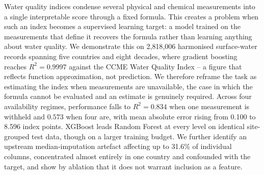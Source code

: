 Water quality indices condense several physical and chemical measurements into a single
interpretable score through a fixed formula. This creates a problem when such an index
becomes a supervised learning target: a model trained on the measurements that define it
recovers the formula rather than learning anything about water quality. We demonstrate
this on 2{,}818{,}006 harmonised surface-water records spanning five countries and eight
decades, where gradient boosting reaches $R^2 = 0.9997$ against the CCME Water Quality
Index -- a figure that reflects function approximation, not prediction. We therefore
reframe the task as estimating the index when measurements are unavailable, the case in
which the formula cannot be evaluated and an estimate is genuinely required. Across four
availability regimes, performance falls to $R^2 = 0.834$ when one measurement is withheld
and $0.573$ when four are, with mean absolute error rising from 0.100 to 8.596 index
points. XGBoost leads Random Forest at every level on identical site-grouped test
data, though on a larger training budget.
We further identify an upstream median-imputation artefact affecting up to 31.6\% of
individual columns, concentrated almost entirely in one country and confounded with the
target, and show by ablation that it does not warrant inclusion as a feature.
